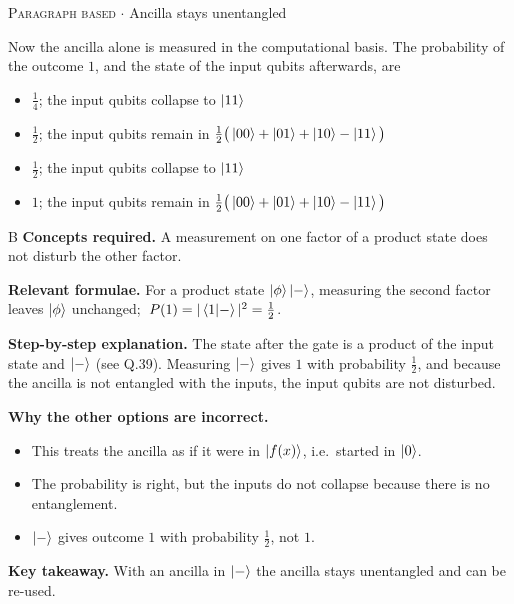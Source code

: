 \documentclass[11pt,a4paper]{article}
\newcommand{\optlabel}[1]{\textbf{(#1)}}
\newcommand{\correctlabel}[1]{\textcolor{okgreen}{\textbf{(#1)}\,\ding{51}}}
\newenvironment{qitem}[1]{\begin{list}{}{\setlength{\leftmargin}{3.3em}\setlength{\labelwidth}{3.1em}%
  \setlength{\labelsep}{0.2em}\setlength{\topsep}{3pt}\setlength{\parsep}{3pt}}\item[\textbf{Q.#1}\hfill]}{\end{list}}
\newcommand{\qsep}{\par\vspace{2pt}{\color{black!15}\hrule}\vspace{4pt}}
\newcommand{\qmeta}[2]{{\footnotesize\color{black!60}\textsc{#1} \;$\cdot$\; #2}\par}
\begin{document}
\begin{qitem}{40}
\qmeta{Paragraph based}{Ancilla stays unentangled}
Now the ancilla alone is measured in the computational basis. The probability of the outcome $1$, and the state of the input qubits afterwards, are
\begin{itemize}[leftmargin=2.6em, labelsep=0.4em, itemsep=2pt, topsep=3pt]
\item[\optlabel{A}] $\frac14$; the input qubits collapse to $\ket{11}$
\item[\correctlabel{B}] $\frac12$; the input qubits remain in $\frac12\big(\ket{00} + \ket{01} + \ket{10} - \ket{11}\big)$
\item[\optlabel{C}] $\frac12$; the input qubits collapse to $\ket{11}$
\item[\optlabel{D}] $1$; the input qubits remain in $\frac12\big(\ket{00} + \ket{01} + \ket{10} - \ket{11}\big)$
\end{itemize}
\end{qitem}
\begin{solbox}{B}
\textbf{\color{brand}Concepts required.} A measurement on one factor of a product state does not disturb the other factor.

\textbf{\color{brand}Relevant formulae.} For a product state $\ket\phi\ket{-}$, measuring the second factor leaves $\ket\phi$ unchanged; $\;P(1) = |\braket{1|-}|^2 = \frac12$.

\textbf{\color{brand}Step-by-step explanation.} The state after the gate is a product of the input state and $\ket{-}$ (see Q.39). Measuring $\ket{-}$ gives $1$ with probability $\frac12$, and because the ancilla is not entangled
with the inputs, the input qubits are not disturbed.

\textbf{\color{brand}Why the other options are incorrect.}
\begin{itemize}[leftmargin=2.4em, itemsep=1pt, topsep=2pt]
\item[\textbf{(A)}] This treats the ancilla as if it were in $\ket{f(x)}$, i.e.\ started in $\ket0$.
\item[\textbf{(C)}] The probability is right, but the inputs do not collapse because there is no entanglement.
\item[\textbf{(D)}] $\ket{-}$ gives outcome $1$ with probability $\frac12$, not $1$.
\end{itemize}
\textbf{\color{brand}Key takeaway.} With an ancilla in $\ket{-}$ the ancilla stays unentangled and can be re-used.
\end{solbox}
\qsep
\end{document}
